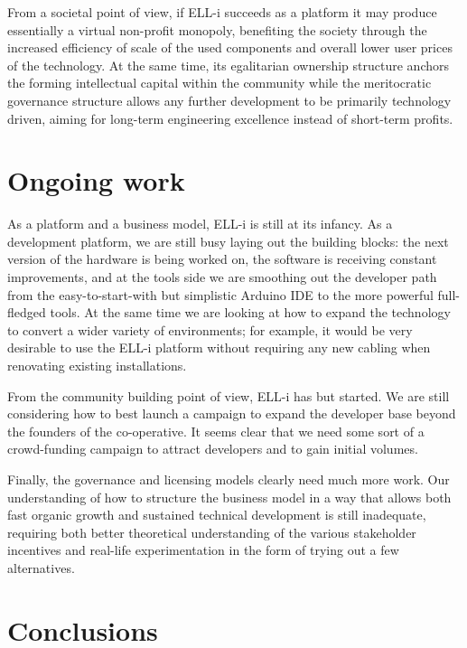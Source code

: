 \documentclass{siamltex}
\begin{document}
From a societal point of view, if ELL-i succeeds as a platform it may
produce essentially a virtual non-profit monopoly, benefiting the
society through the increased efficiency of scale of the used
components and overall lower user prices of the technology.  At the
same time, its egalitarian ownership structure anchors the forming
intellectual capital within the community while the meritocratic
governance structure allows any further development to be primarily
technology driven, aiming for long-term engineering excellence instead
of short-term profits.


\section{Ongoing work}
\label{sec:ongoing}

As a platform and a business model, ELL-i is still at its infancy.  As
a development platform, we are still busy laying out the building
blocks: the next version of the hardware is being worked on, the
software is receiving constant improvements, and at the tools side we
are smoothing out the developer path from the easy-to-start-with but
simplistic Arduino IDE to the more powerful full-fledged tools.  At
the same time we are looking at how to expand the technology to convert
a wider variety of environments; for example, it would be very
desirable to use the ELL-i platform without requiring any new cabling
when renovating existing installations.

From the community building point of view, ELL-i has but started.
We are still considering how to best launch a campaign to expand the
developer base beyond the founders of the co-operative.  It seems
clear that we need some sort of a crowd-funding campaign to attract
developers and to gain initial volumes.

Finally, the governance and licensing models clearly need much more
work.  Our understanding of how to structure the business model in a
way that allows both fast organic growth and sustained technical
development is still inadequate, requiring both better theoretical
understanding of the various stakeholder incentives and real-life
experimentation in the form of trying out a few alternatives.


\section{Conclusions}
\label{sec:conclusions}
\end{document}
